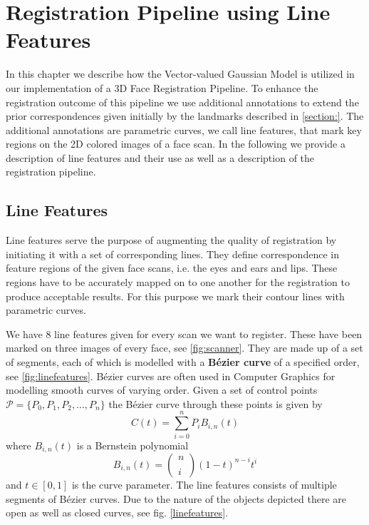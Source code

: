 \chapter{Registration Pipeline using Line Features}
In this chapter we describe how the Vector-valued Gaussian Model is utilized in our implementation of a 3D Face Registration Pipeline. To enhance the registration outcome of this pipeline we use additional annotations to extend the prior correspondences given initially by the landmarks described in \ref{section:}. The additional annotations are parametric curves, we call line features, that mark key regions on the 2D colored images of a face scan. In the following we provide a description of line features and their use
as well as a description of the registration pipeline. 

\section{Line Features}
Line features serve the purpose of augmenting the quality of registration by initiating it with a set of corresponding lines. They define correspondence in feature regions of the given face scans, i.e. the eyes and ears and lips. These regions have to be accurately mapped on to one another for the registration to produce acceptable results. For this purpose we mark their contour lines with parametric curves. 

We have 8 line features given for every scan we want to register. These have been marked on three images of every face, see \ref{fig:scanner}. They are made up of a set of segments, each of which is modelled with a \textbf{B\'{e}zier curve} of a specified order, see \ref{fig:linefeatures}. B\'{e}zier curves are often used in Computer
Graphics for modelling smooth curves of varying order. Given a set of control points $\mathcal{P} = \{P_{0}, P_{1}, P_{2}, \ldots, P_{n}\}$ the B\'{e}zier curve through these points is given by
\begin{equation}
    C(t)=\sum_{i=0}^{n}P_{i}B_{i,n}(t)
\end{equation}
where $B_{i,n}(t)$ is a Bernstein polynomial 
\begin{equation}
    B_{i,n}(t)=\begin{pmatrix} n \\ \\ i \end{pmatrix}(1-t)^{n-i}t^i
\end{equation}
and $t \in [0,1]$ is the curve parameter. The line features consists of multiple segments of B\'{e}zier curves. Due to the nature of the objects depicted there are open as well as closed curves, see fig. \ref{linefeatures}. 

